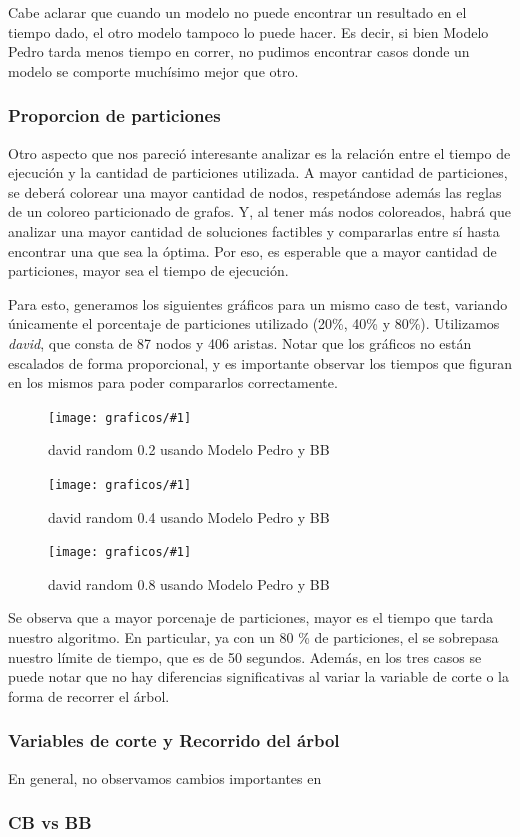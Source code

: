 \documentclass[a4paper, 10pt, twoside]{article}
\newcommand{\diagramavfig}[2]{%
  \begin{figure}[H]
    \texttt{[image: graficos/\#1]}%
    \caption{#2}
    \label{fig:#1}
  \end{figure}
}
\begin{document}
Cabe aclarar que cuando un modelo no puede encontrar un resultado en el tiempo dado, el otro modelo tampoco lo puede hacer. Es decir, si bien Modelo Pedro tarda menos tiempo en correr, no pudimos encontrar casos donde un modelo se comporte muchísimo mejor que otro.


\subsubsection{Proporcion de particiones}
Otro aspecto que nos pareció interesante analizar es la relación entre el tiempo de ejecución y la cantidad de particiones utilizada. A mayor cantidad de particiones, se deberá colorear una mayor cantidad de nodos, respetándose además las reglas de un coloreo particionado de grafos. Y, al tener más nodos coloreados, habrá que analizar una mayor cantidad de soluciones factibles y compararlas entre sí hasta encontrar una que sea la óptima. Por eso, es esperable que a mayor cantidad de particiones, mayor sea el tiempo de ejecución.

Para esto, generamos los siguientes gráficos para un mismo caso de test, variando únicamente el porcentaje de particiones utilizado (20\%, 40\% y 80\%). Utilizamos \emph{david}, que consta de 87 nodos y 406 aristas. Notar que los gráficos no están escalados de forma proporcional, y es importante observar los tiempos que figuran en los mismos para poder compararlos correctamente.

\diagramavfig{david_random_0.2_bb_0_segunJuntada}{david random 0.2 usando Modelo Pedro y BB}
\diagramavfig{david_random_0.4_bb_0_segunJuntada}{david random 0.4 usando Modelo Pedro y BB}
\diagramavfig{david_random_0.8_bb_0_segunJuntada}{david random 0.8 usando Modelo Pedro y BB}

Se observa que a mayor porcenaje de particiones, mayor es el tiempo que tarda nuestro algoritmo. En particular, ya con un 80 \% de particiones, el se sobrepasa nuestro límite de tiempo, que es de 50 segundos. Además, en los tres casos se puede notar que no hay diferencias significativas al variar la variable de corte o la forma de recorrer el árbol.

\subsubsection{Variables de corte y Recorrido del árbol}
En general, no observamos cambios importantes en 

\subsubsection{CB vs BB}
	
\end{document}
